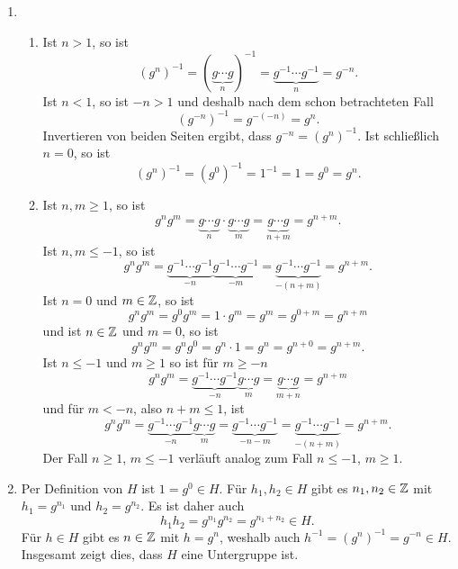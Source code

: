 \begin{solution}
 \begin{enumerate}
  \item
   \begin{enumerate}
    \item
     Ist $n > 1$, so ist
     \[
      (g^n)^{-1} = (\underbrace{g \dotsm g}_n)^{-1} = \underbrace{g^{-1} \dotsm g^{-1}}_n = g^{-n}.
     \]
     Ist $n < 1$, so ist $-n > 1$ und deshalb nach dem schon betrachteten Fall
     \[
      (g^{-n})^{-1} = g^{-(-n)} = g^n.
     \]
     Invertieren von beiden Seiten ergibt, dass $g^{-n} = (g^n)^{-1}$. Ist schließlich $n = 0$, so ist
     \[
      (g^n)^{-1} = (g^0)^{-1} = 1^{-1} = 1 = g^0 = g^n.
     \]
    \item
     Ist $n, m \geq 1$, so ist
     \[
      g^n g^m
      = \underbrace{g \dotsm g}_n \cdot \underbrace{g \dotsm g}_m
      = \underbrace{g \dotsm g}_{n+m} = g^{n+m}.
     \]
     Ist $n, m \leq -1$, so ist
     \[
      g^n g^m
      = \underbrace{g^{-1} \dotsm g^{-1}}_{-n} \underbrace{g^{-1} \dotsm g^{-1}}_{-m}
      = \underbrace{g^{-1} \dotsm g^{-1}}_{-(n+m)}
      = g^{n+m}.
     \]
     Ist $n = 0$ und $m \in \mathbb{Z}$, so ist
     \[
      g^n g^m = g^0 g^m = 1 \cdot g^m = g^m = g^{0+m} = g^{n+m}
     \]
     und ist $n \in \mathbb{Z}$ und $m = 0$, so ist
     \[
      g^n g^m = g^n g^0 = g^n \cdot 1 = g^n = g^{n+0} = g^{n+m}.
     \]
     Ist $n \leq -1$ und $m \geq 1$ so ist für $m \geq -n$
     \[
      g^n g^m
      = \underbrace{g^{-1} \dotsm g^{-1}}_{-n} \underbrace{g \dotsm g}_m
      = \underbrace{g \dotsm g}_{m+n}
      = g^{n+m}
     \]
     und für $m < -n$, also $n+m \leq 1$, ist
     \[
      g^n g^m
      = \underbrace{g^{-1} \dotsm g^{-1}}_{-n} \underbrace{g \dotsm g}_m
      = \underbrace{g^{-1} \dotsm g^{-1}}_{-n-m}
      = \underbrace{g^{-1} \dotsm g^{-1}}_{-(n+m)}
      = g^{n+m}.
     \]
     Der Fall $n \geq 1$, $m \leq -1$ verläuft analog zum Fall $n \leq -1$, $m \geq 1$.
   \end{enumerate}
  \item
   Per Definition von $H$ ist $1 = g^0 \in H$. Für $h_1, h_2 \in H$ gibt es $n_1, n_2 \in \mathbb{Z}$ mit $h_1 = g^{n_1}$ und $h_2 = g^{n_2}$. Es ist daher auch
   \[
    h_1 h_2 = g^{n_1} g^{n_2} = g^{n_1 + n_2} \in H.
   \]
   Für $h \in H$ gibt es $n \in \mathbb{Z}$ mit $h = g^n$, weshalb auch $h^{-1} = (g^n)^{-1} = g^{-n} \in H$. Insgesamt zeigt dies, dass $H$ eine Untergruppe ist.
 \end{enumerate}
\end{solution}


